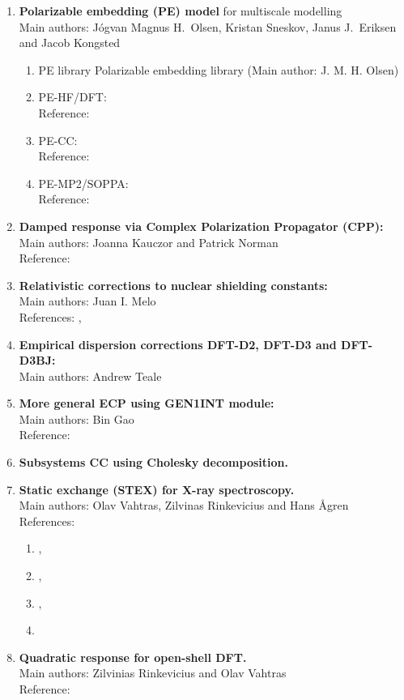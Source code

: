 \begin{enumerate}
\item{\bf  Polarizable embedding (PE) model} for multiscale modelling \\
Main authors: J\'{o}gvan Magnus H.\ Olsen, Kristan Sneskov, Janus J.\ Eriksen and Jacob Kongsted
\begin{enumerate}
  \item{PE library} Polarizable embedding library (Main author: J. M. H. Olsen)
  \item{PE-HF/DFT:}  \\
   Reference:  \cite{pescf}
  \item{PE-CC:}  \\
   Reference:  \cite{pecc}
  \item{PE-MP2/SOPPA:}  \\
   Reference:  \cite{pesoppa}
\end{enumerate}
\item{\bf  Damped response via Complex Polarization Propagator (CPP):} \\
Main authors: Joanna Kauczor and Patrick Norman \\
Reference:  \cite{kauczor:2011}
\item{\bf  Relativistic corrections to nuclear shielding constants:}  \\
Main authors: Juan I. Melo \\
 References:   \cite{melojcp03},  \cite{melomaldojcp12}
\item{\bf  Empirical dispersion corrections DFT-D2, DFT-D3 and DFT-D3BJ:}  \\
Main authors: Andrew Teale
\item{\bf  More general ECP using GEN1INT module:} \\
Main authors: Bin Gao \\
 Reference:  \cite{gen1int}
\item{\bf  Subsystems CC using Cholesky decomposition.}
\item{\bf  Static exchange (STEX) for X-ray spectroscopy.} \\
Main authors: Olav Vahtras, Zilvinas Rinkevicius and Hans {\AA}gren\\
References:
\begin{enumerate}
\item {}\cite{niskanencppc13},
\item {}\cite{luopra97},
\item {}\cite{vahtrasjpb97},
\item {}\cite{agrencpl94}
\end{enumerate}
\item{\bf  Quadratic response for open-shell DFT.}\\
Main authors: Zilvinias Rinkevicius and Olav Vahtras\\
Reference:
 \cite{rinkeviciusjctc08}
\end{enumerate}

